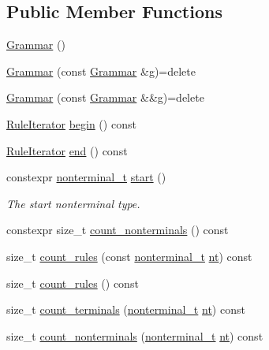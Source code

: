\subsection*{Public Member Functions}
\begin{DoxyCompactItemize}
\item 
\hyperlink{class_grammar_aeeaa7bf30a9984e9b2c74b9924856066}{Grammar} ()
\item 
\hyperlink{class_grammar_a0ab84ce4f0bce6a88d73c5d91779fc62}{Grammar} (const \hyperlink{class_grammar}{Grammar} \&g)=delete
\item 
\hyperlink{class_grammar_abfd571fb8e63af1bb50957e70c115cbc}{Grammar} (const \hyperlink{class_grammar}{Grammar} \&\&g)=delete
\item 
\hyperlink{class_grammar_1_1_rule_iterator}{Rule\+Iterator} \hyperlink{class_grammar_aee5716f6501e8a366e33e12c7a675b8d}{begin} () const
\item 
\hyperlink{class_grammar_1_1_rule_iterator}{Rule\+Iterator} \hyperlink{class_grammar_a141508d214bb721b71e8ee27a1aa2915}{end} () const
\item 
constexpr \hyperlink{_nonterminal_8h_a1c5bfe9b903f69c83bbde5da7035fef3}{nonterminal\+\_\+t} \hyperlink{class_grammar_a7126c9e6abbedc4c43047c0ddd2cce5a}{start} ()
\begin{DoxyCompactList}\small\item\em The start nonterminal type. \end{DoxyCompactList}\item 
constexpr size\+\_\+t \hyperlink{class_grammar_ab0bae5bff5a5a8f97116ae49eb6d3a15}{count\+\_\+nonterminals} () const
\item 
size\+\_\+t \hyperlink{class_grammar_acb0ad7c8f130df2dd73bb5040bdf0fa2}{count\+\_\+rules} (const \hyperlink{_nonterminal_8h_a1c5bfe9b903f69c83bbde5da7035fef3}{nonterminal\+\_\+t} \hyperlink{class_grammar_ac7ec043aec5203a2cfac44f9cec50132}{nt}) const
\item 
size\+\_\+t \hyperlink{class_grammar_af6f447aca4141c52f3197eac688c0be7}{count\+\_\+rules} () const
\item 
size\+\_\+t \hyperlink{class_grammar_a44c81f50a71a83e95b558d32fa1715c4}{count\+\_\+terminals} (\hyperlink{_nonterminal_8h_a1c5bfe9b903f69c83bbde5da7035fef3}{nonterminal\+\_\+t} \hyperlink{class_grammar_ac7ec043aec5203a2cfac44f9cec50132}{nt}) const
\item 
size\+\_\+t \hyperlink{class_grammar_acf1de192a73f1c07c44375eb9e08d309}{count\+\_\+nonterminals} (\hyperlink{_nonterminal_8h_a1c5bfe9b903f69c83bbde5da7035fef3}{nonterminal\+\_\+t} \hyperlink{class_grammar_ac7ec043aec5203a2cfac44f9cec50132}{nt}) const

\end{DoxyCompactItemize}
